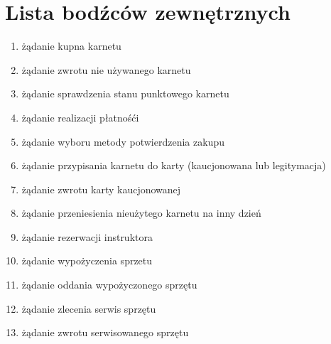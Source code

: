 \section{Lista bodźców zewnętrznych}
\begin{enumerate}
	\item żądanie kupna karnetu
	\item żądanie zwrotu nie używanego karnetu
	\item żądanie sprawdzenia stanu punktowego karnetu 
	\item żądanie realizacji płatnośći
	\item żądanie wyboru metody potwierdzenia zakupu
	\item żądanie przypisania karnetu do karty (kaucjonowana lub legitymacja)
	\item żądanie zwrotu karty kaucjonowanej
	\item żądanie przeniesienia nieużytego karnetu na inny dzień
	\item żądanie rezerwacji instruktora
	\item żądanie wypożyczenia sprzetu
	\item żądanie oddania wypożyczonego sprzętu
	\item żądanie zlecenia serwis sprzętu
	\item żądanie zwrotu serwisowanego sprzętu
\end{enumerate}